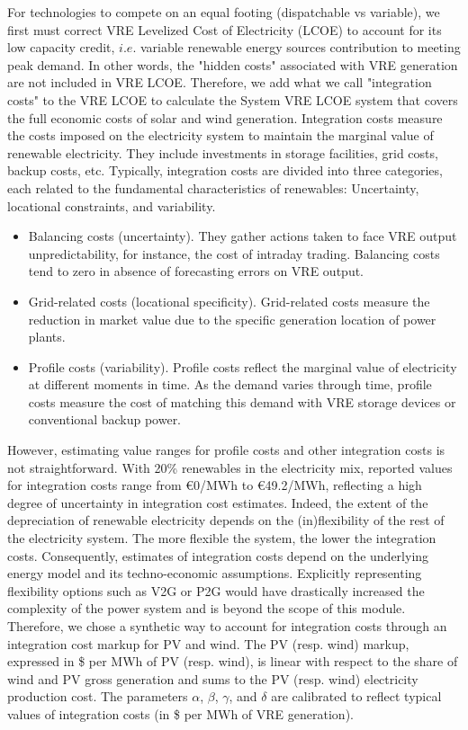  For technologies to compete on an equal footing (dispatchable vs variable), we first must correct VRE Levelized Cost of Electricity (LCOE) to account for its low capacity credit, $i.e.$ variable renewable energy sources contribution to meeting peak demand. In other words, the "hidden costs" associated with VRE generation are not included in VRE LCOE. Therefore, we add what we call "integration costs" to the VRE LCOE to calculate the System VRE LCOE system that covers the full economic costs of solar and wind generation. Integration costs measure the costs imposed on the electricity system to maintain the marginal value of renewable electricity. They include investments in storage facilities, grid costs, backup costs, etc. Typically, integration costs are divided into three categories, each related to the fundamental characteristics of renewables: Uncertainty, locational constraints, and variability.
\begin{itemize}
    \item Balancing costs (uncertainty). They gather actions taken to face VRE output unpredictability, for instance, the cost of intraday trading. Balancing costs tend to zero in absence of forecasting errors on VRE output.
    \item Grid-related costs (locational specificity). Grid-related costs measure the reduction in market value due to the specific generation location of power plants. 
    \item Profile costs (variability). Profile costs reflect the marginal value of electricity at different moments in time. As the demand varies through time, profile costs measure the cost of matching this demand with VRE storage devices or conventional backup power.
\end{itemize}

However, estimating value ranges for profile costs and other integration costs is not straightforward. With 20\% renewables in the electricity mix, reported values for integration costs range from €0/MWh to €49.2/MWh, \cite{Heptonstall2021} reflecting a high degree of uncertainty in integration cost estimates. Indeed, the extent of the depreciation of renewable electricity depends on the (in)flexibility of the rest of the electricity system. The more flexible the system, the lower the integration costs. Consequently, estimates of integration costs depend on the underlying energy model and its techno-economic assumptions. Explicitly representing flexibility options such as V2G or P2G would have drastically increased the complexity of the power system and is beyond the scope of this module. Therefore, we chose a synthetic way to account for integration costs through an integration cost markup for PV and wind. The PV (resp. wind) markup, expressed in \$ per MWh of PV (resp. wind), is linear with respect to the share of wind and PV gross generation and sums to the PV (resp. wind) electricity production cost. The parameters $\alpha$, $\beta$, $\gamma$, and $\delta$ are calibrated to reflect typical values of integration costs (in \$ per MWh of VRE generation).

